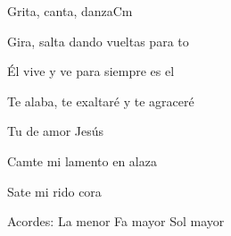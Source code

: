 \documentclass[12pt, spanish]{book}
\begin{document}
\begin{song}{Grita, canta, danza}{Cm}
\begin{SBExtraKeys}
{\begin{SBChorus}
                Gira, salta dando vueltas para to

                Él vive y ve para siempre es el 
            \end{SBChorus}


            \begin{SBOpGroup}
                Te alaba, te exaltaré y te agraceré

                Tu de amor Jesús

                Camte mi lamento en alaza

                Sate mi rido cora 
            \end{SBOpGroup}

            \ifChordBk
            \begin{SBOpGroup}
                Acordes:
                \upchord{\Am}\qquad La menor \hfill
                \upchord{\F}\qquad Fa mayor \hfill\null\break
                \upchord{\G}\qquad Sol mayor \hfill\null\break
            \end{SBOpGroup}
            \fi
        }\end{SBExtraKeys}
    \end{song}
\end{document}
